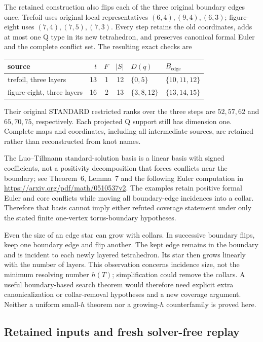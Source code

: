 The retained construction also flips each of the three original boundary
edges once.  Trefoil uses original local representatives
$(6,4),(9,4),(6,3)$; figure-eight uses $(7,4),(7,5),(7,3)$.
Every step retains the old coordinates, adds at most one Q type in its
new tetrahedron, and preserves canonical formal Euler and the complete
conflict set.  The resulting exact checks are
\begin{center}
\begin{tabular}{lrrrll}
source & $t$ & $F$ & $|S|$ & $D(q)$ & $B_{\mathrm{edge}}$\\\hline
trefoil, three layers &13&1&12&$\{0,5\}$&$\{10,11,12\}$\\
figure-eight, three layers &16&2&13&$\{3,8,12\}$&$\{13,14,15\}$
\end{tabular}
\end{center}
Their original STANDARD restricted ranks over the three steps are
$52,57,62$ and $65,70,75$, respectively.  Each projected Q support
still has dimension one.  Complete maps and coordinates, including all
intermediate sources, are retained rather than reconstructed from knot
names.

The Luo--Tillmann standard-solution basis is a linear basis with signed
coefficients, not a positivity decomposition that forces conflicts near
the boundary; see Theorem~6, Lemma~7 and the following Euler computation
in \url{https://arxiv.org/pdf/math/0510537v2}.  The examples retain
positive formal Euler and core conflicts while moving all boundary-edge
incidences into a collar.  Therefore that basis cannot imply either
refuted coverage statement under only the stated finite one-vertex
torus-boundary hypotheses.

Even the size of an edge star can grow with collars.  In successive
boundary flips, keep one boundary edge and flip another.  The kept edge
remains in the boundary and is incident to each newly layered tetrahedron.
Its star then grows linearly with the number of layers.  This observation
concerns incidence size, not the minimum resolving number $h(T)$;
simplification could remove the collars.  A useful boundary-based search
theorem would therefore need explicit extra canonicalization or
collar-removal hypotheses and a new coverage argument.  Neither a
uniform small-$h$ theorem nor a growing-$h$ counterfamily is proved here.

\subsection{Retained inputs and fresh solver-free replay}

